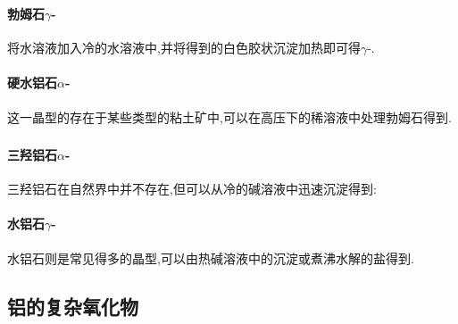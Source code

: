 \documentclass{ctexart}
\begin{document}
\subsubsection{}
\paragraph{勃姆石$\gamma$-}
将水溶液加入冷的水溶液中,并将得到的白色胶状沉淀加热即可得$\gamma$-.
\paragraph{硬水铝石$\alpha$-}
这一晶型的存在于某些类型的粘土矿中,可以在高压下的稀溶液中处理勃姆石得到.
\subsubsection{}
\paragraph{三羟铝石$\alpha$-}
三羟铝石在自然界中并不存在,但可以从冷的碱溶液中迅速沉淀得到:
\begin{center}
\end{center}
\paragraph{水铝石$\gamma$-}
水铝石则是常见得多的晶型,可以由热碱溶液中的沉淀或煮沸水解的盐得到.
\subsection{铝的复杂氧化物}
\end{document}
